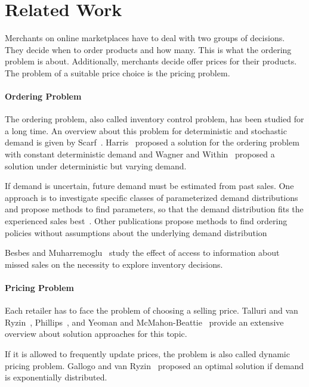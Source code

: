 
\chapter{Related Work}

Merchants on online marketplaces have to deal with two groups of decisions.
They decide when to order products and how many.
This is what the ordering problem is about.
Additionally, merchants decide offer prices for their products.
The problem of a suitable price choice is the pricing problem.

\subsubsection*{Ordering Problem}
The ordering problem, also called inventory control problem, has been studied for a long time.
An overview about this problem for deterministic and stochastic demand is given by Scarf~\cite{scarf1963survey}.
Harris~\cite{harris1913many} proposed a solution for the ordering problem with constant deterministic demand and Wagner and Within~\cite{wagner1958dynamic} proposed a solution under deterministic but varying demand.

If demand is uncertain, future demand must be estimated from past sales.
One approach is to investigate specific classes of parameterized demand distributions and propose methods to find parameters, so that the demand distribution fits the experienced sales best~\cite{azoury1985bayes}.
Other publications propose methods to find ordering policies without assumptions about the underlying demand distribution~\cite{DBLP:journals/mor/LeviRS07,huh2011adaptive,ban2017big}

Besbes and Muharremoglu~\cite{DBLP:journals/mansci/BesbesM13} study the effect of access to information about missed sales on the necessity to explore inventory decisions.

\subsubsection*{Pricing Problem}
Each retailer has to face the problem of choosing a selling price.
Talluri and van Ryzin~\cite{talluri2004theory}, Phillips~\cite{phillips2005pricing}, and Yeoman and McMahon-Beattie~\cite{yeoman2010revenue} provide an extensive overview about solution approaches for this topic.

If it is allowed to frequently update prices, the problem is also called dynamic pricing problem.
Gallogo and van Ryzin~\cite{gallego1994optimal} proposed an optimal solution if demand is exponentially distributed.

